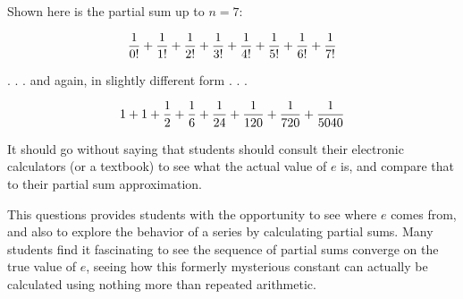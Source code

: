 \vskip 10pt

Shown here is the partial sum up to $n=7$:

$${1 \over 0!} + {1 \over 1!} + {1 \over 2!} + {1 \over 3!} + {1 \over 4!} + {1 \over 5!} + {1 \over 6!} + {1 \over 7!}$$

\vskip 10pt

. . . and again, in slightly different form . . .

$$1 + 1 + {1 \over 2} + {1 \over 6} + {1 \over 24} + {1 \over 120} + {1 \over 720} + {1 \over 5040}$$







It should go without saying that students should consult their electronic calculators (or a textbook) to see what the actual value of $e$ is, and compare that to their partial sum approximation.

This questions provides students with the opportunity to see where $e$ comes from, and also to explore the behavior of a series by calculating partial sums.  Many students find it fascinating to see the sequence of partial sums converge on the true value of $e$, seeing how this formerly mysterious constant can actually be calculated using nothing more than repeated arithmetic.




